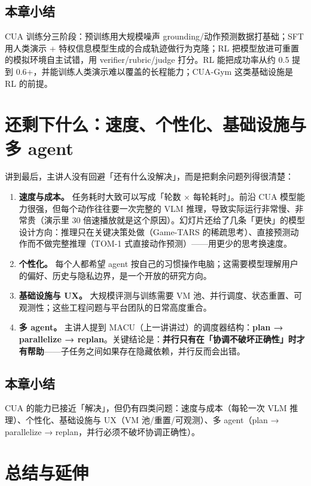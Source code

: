 ﻿\documentclass[a4paper]{article}
\begin{document}
\subsection{本章小结}
CUA 训练分三阶段：预训练用大规模噪声 grounding/动作预测数据打基础；SFT 用人类演示 + 特权信息模型生成的合成轨迹做行为克隆；RL 把模型放进可重置的模拟环境自主试错，用 verifier/rubric/judge 打分。RL 能把成功率从约 0.5 提到 0.6+，并能训练人类演示难以覆盖的长程能力；CUA-Gym 这类基础设施是 RL 的前提。

\section{还剩下什么：速度、个性化、基础设施与多 agent}

讲到最后，主讲人没有回避「还有什么没解决」，而是把剩余问题列得很清楚：

\begin{enumerate}
\item \textbf{速度与成本。} 任务耗时大致可以写成「轮数 × 每轮耗时」。前沿 CUA 模型能力很强，但每个动作往往要一次完整的 VLM 推理，导致实际运行非常慢、非常贵（演示里 30 倍速播放就是这个原因）。幻灯片还给了几条「更快」的模型设计方向：推理只在关键决策处做（Game-TARS 的稀疏思考）、直接预测动作而不做完整推理（TOM-1 式直接动作预测）——用更少的思考换速度。
\item \textbf{个性化。} 每个人都希望 agent 按自己的习惯操作电脑；这需要模型理解用户的偏好、历史与隐私边界，是一个开放的研究方向。
\item \textbf{基础设施与 UX。} 大规模评测与训练需要 VM 池、并行调度、状态重置、可观测性；这些工程问题与平台团队的日常高度重合。
\item \textbf{多 agent。} 主讲人提到 MACU（上一讲讲过）的调度器结构：\textbf{plan → parallelize → replan}。关键结论是：\textbf{并行只有在「协调不破坏正确性」时才有帮助}——子任务之间如果存在隐藏依赖，并行反而会出错。
\end{enumerate}

\subsection{本章小结}
CUA 的能力已接近「解决」，但仍有四类问题：速度与成本（每轮一次 VLM 推理）、个性化、基础设施与 UX（VM 池/重置/可观测）、多 agent（plan → parallelize → replan，并行必须不破坏协调正确性）。

\section{总结与延伸}
\end{document}
